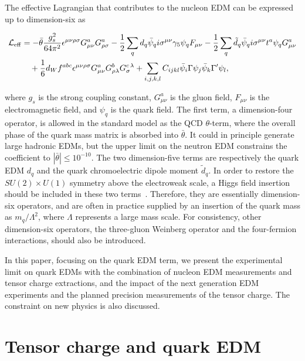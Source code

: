 \documentclass[aps,prd,twocolumn,groupedaddress,showpacs,superscriptaddress,floatfix,nofootinbib,10pt]{revtex4-1}
\begin{document}
The effective Lagrangian that contributes to the nucleon EDM can be expressed up to dimension-six as~\cite{Grzadkowski:2010es}
\begin{widetext}
\begin{equation}
\begin{split}
\mathcal{L}_{\rm eff}&=
-\bar{\theta}\frac{g_s^2}{64\pi^2}\epsilon^{\mu\nu\rho\sigma}G_{\mu\nu}^a G_{\rho\sigma}^a
-\frac{1}{2}\sum_q d_q\bar{\psi}_q i\sigma^{\mu\nu}\gamma_5\psi_q F_{\mu\nu}
-\frac{1}{2}\sum_q \tilde{d}_q\bar{\psi}_q i\sigma^{\mu\nu}t^a\psi_q G_{\mu\nu}^a\\
&\quad +\frac{1}{6}d_W f^{abc}\epsilon^{\mu\nu\rho\sigma}G_{\mu\nu}^a G_{\rho\lambda}^b G_{\sigma}^{c\,\lambda}
+\sum_{i,j,k,l}C_{ijkl}\bar{\psi}_i\Gamma\psi_j \bar{\psi}_k\Gamma'\psi_l,
\end{split}\label{Leff}
\end{equation}
\end{widetext}
where $g_s$ is the strong coupling constant, $G_{\mu\nu}^a$ is the gluon field, $F_{\mu\nu}$ is the electromagnetic field, and $\psi_q$ is the quark field. The first term, a dimension-four operator, is allowed in the standard model as the QCD $\theta$-term, where the overall phase of the quark mass matrix is absorbed into $\bar{\theta}$. It could in principle generate large hadronic EDMs, but the upper limit on the neutron EDM constrains the coefficient to $|\bar{\theta}|\leq 10^{-10}$. The two dimension-five terms are respectively the quark EDM $d_q$ and the quark chromoelectric dipole moment $\tilde{d}_q$. In order to restore the $SU(2)\times U(1)$ symmetry above the electroweak scale, a Higgs field insertion should be included in these two terms~\cite{DeRujula:1990db}. Therefore, they are essentially dimension-six operators, and are often in practice supplied by an insertion of the quark mass as $m_q/\Lambda^2$, where $\Lambda$ represents a large mass scale. For consistency, other dimension-six operators, the three-gluon Weinberg operator and the four-fermion interactions, should also be introduced.

In this paper, focusing on the quark EDM term, we present the experimental limit on quark EDMs with the combination of nucleon EDM measurements and tensor charge extractions, and the impact of the next generation EDM experiments and the planned precision measurements of the tensor charge. The constraint on new physics is also discussed.


\section{Tensor charge and quark EDM}
\end{document}
